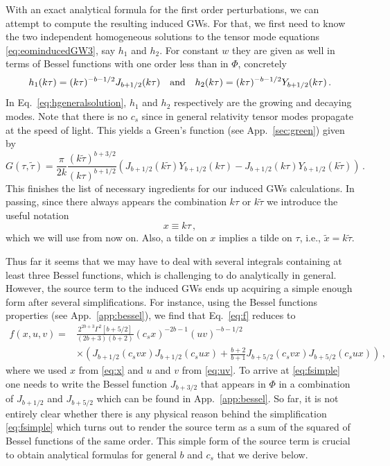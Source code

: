 \documentclass[a4paper,11pt]{article}
\numberwithin{equation}{section}
\begin{document}
With an exact analytical formula for the first order perturbations, we can attempt to compute the resulting induced GWs. For that, we first need to know  the two independent homogeneous solutions to the tensor mode equations \eqref{eq:eominducedGW3}, say $h_1$ and $h_2$. For constant $w$ they are given as well in terms of Bessel functions with one order less than in $\Phi$, concretely
\begin{equation}\label{eq:hgeneralsolution}
h_1(k\tau)=(k\tau)^{-b-1/2}J_{b+1/2}(k\tau)\quad{\rm and}\quad h_2(k\tau)=(k\tau)^{-b-1/2} Y_{b+1/2}(k\tau)\,.
\end{equation}
In Eq.~\eqref{eq:hgeneralsolution}, $h_1$ and $h_2$ respectively are the growing and decaying modes.
Note that there is no $c_s$ since in general relativity tensor modes propagate at the speed of light. This yields a Green's function (see App.~\ref{sec:green}) given by
\begin{equation}\label{eq:hgreen}
G(\tau,\tilde\tau)=\frac{\pi}{2k}\frac{(k\tilde\tau)^{b+3/2}}{(k\tau)^{b+1/2}}\left(J_{b+1/2}(k\tilde \tau)Y_{b+1/2}(k\tau)-J_{b+1/2}(k\tau)Y_{b+1/2}(k\tilde\tau)\right)\,.
\end{equation}
This finishes the list of necessary ingredients for our induced GWs calculations. In passing, since there always appears the combination $k\tau$ or $k\tilde\tau$ we introduce the useful notation
\begin{equation}\label{eq:x}
x\equiv k\tau\,,
\end{equation}
which we will use from now on. Also, a tilde on $x$ implies a tilde on $\tau$, i.e., $\tilde x=k\tilde\tau$.

Thus far it seems that we may have to deal with several integrals containing at least three Bessel functions, which is challenging to do analytically in general. However, the source term to the induced GWs ends up acquiring a simple enough form after several simplifications. For instance, using the Bessel functions properties (see App.~\ref{app:bessel}), we find that Eq.~\eqref{eq:f} reduces to
\begin{align}\label{eq:fsimple}
f(x,u,v)=&\frac{2^{2b+3}\Gamma^2[b+5/2]}{(2b+3)(b+2)}(c_sx)^{-2b-1}(uv)^{-b-1/2}\nonumber\\&\times\left(J_{b+1/2}(c_svx)J_{b+1/2}(c_sux)+\frac{b+2}{b+1}J_{b+5/2}(c_svx)J_{b+5/2}(c_sux)\right)\,,
\end{align}
where we used $x$ from \eqref{eq:x} and $u$ and $v$ from \eqref{eq:uv}. To arrive at \eqref{eq:fsimple} one needs to write the Bessel function $J_{b+3/2}$ that appears in $\Phi$ in a combination of $J_{b+1/2}$ and $J_{b+5/2}$ which can be found in App.~\ref{app:bessel}.
So far, it is not entirely clear whether there is any physical reason behind the simplification \eqref{eq:fsimple} which turns out to render the source term as a sum of the squared of Bessel functions of the same order. This simple form of the source term is crucial to obtain analytical formulas for general $b$ and $c_s$ that we derive below.
\end{document}
